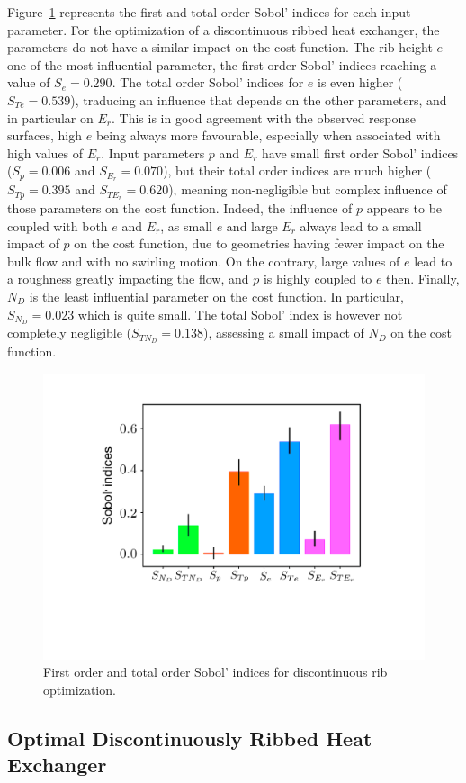Figure~\ref{sensitivity} represents the first and total order Sobol' indices for each input parameter. For the optimization of a discontinuous ribbed heat exchanger, the parameters do not have a similar impact on the cost function. The rib height $e$ one of the most influential parameter, the first order Sobol' indices reaching a value of $S_e = 0.290$. The total order Sobol' indices for $e$ is even higher ($S_{Te} = 0.539$), traducing an influence that depends on the other parameters, and in particular on $E_r$. This is in good agreement with the observed response surfaces, high $e$ being always more favourable, especially when associated with high values of $E_r$. Input parameters $p$ and $E_r$ have small first order Sobol' indices ($S_p = 0.006$ and $S_{E_r} = 0.070$), but their total order indices are much higher ($S_{Tp} = 0.395$ and $S_{TE_r} = 0.620$), meaning non-negligible but complex influence of those parameters on the cost function. Indeed, the influence of $p$ appears to be coupled with both $e$ and $E_r$, as small $e$ and large $E_r$ always lead to a small impact of $p$ on the cost function, due to geometries having fewer impact on the bulk flow and with no swirling motion. On the contrary, large values of $e$ lead to a roughness greatly impacting the flow, and $p$ is highly coupled to $e$ then. Finally, $N_D$ is the least influential parameter on the cost function. In particular, $S_{N_D} = 0.023$ which is quite small. The total Sobol' index is however not completely negligible ($S_{TN_D} = 0.138$), assessing a small impact of $N_D$ on the cost function.

\begin{figure}[!h]
\centering
\includegraphics[width=0.6\linewidth,keepaspectratio]{fig/applications/optim/Sobol_discontinu.pdf}
\caption{First order and total order Sobol' indices for discontinuous rib optimization.}
\label{sensitivity}
\end{figure}

\subsection{Optimal Discontinuously Ribbed Heat Exchanger}
\label{sec:optimal}
